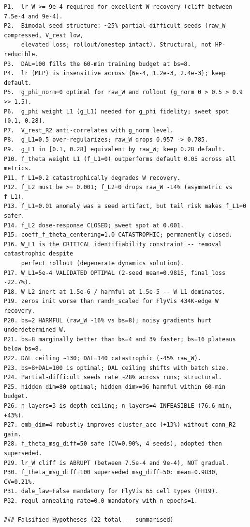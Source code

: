 \documentclass{article}
\begin{document}
\begin{tiny}
\begin{verbatim}
P1.  lr_W >= 9e-4 required for excellent W recovery (cliff between 7.5e-4 and 9e-4).
P2.  Bimodal seed structure: ~25% partial-difficult seeds (raw_W compressed, V_rest low,
     elevated loss; rollout/onestep intact). Structural, not HP-reducible.
P3.  DAL=100 fills the 60-min training budget at bs=8.
P4.  lr (MLP) is insensitive across {6e-4, 1.2e-3, 2.4e-3}; keep default.
P5.  g_phi_norm=0 optimal for raw_W and rollout (g_norm 0 > 0.5 > 0.9 >> 1.5).
P6.  g_phi weight L1 (g_L1) needed for g_phi fidelity; sweet spot [0.1, 0.28].
P7.  V_rest_R2 anti-correlates with g_norm level.
P8.  g_L1=0.5 over-regularizes; raw_W drops 0.957 -> 0.785.
P9.  g_L1 in [0.1, 0.28] equivalent by raw_W; keep 0.28 default.
P10. f_theta weight L1 (f_L1=0) outperforms default 0.05 across all metrics.
P11. f_L1=0.2 catastrophically degrades W recovery.
P12. f_L2 must be >= 0.001; f_L2=0 drops raw_W -14% (asymmetric vs f_L1).
P13. f_L1=0.01 anomaly was a seed artifact, but tail risk makes f_L1=0 safer.
P14. f_L2 dose-response CLOSED; sweet spot at 0.001.
P15. coeff_f_theta_centering=1.0 CATASTROPHIC; permanently closed.
P16. W_L1 is the CRITICAL identifiability constraint -- removal catastrophic despite
     perfect rollout (degenerate dynamics solution).
P17. W_L1=5e-4 VALIDATED OPTIMAL (2-seed mean=0.9815, final_loss -22.7%).
P18. W_L2 inert at 1.5e-6 / harmful at 1.5e-5 -- W_L1 dominates.
P19. zeros init worse than randn_scaled for FlyVis 434K-edge W recovery.
P20. bs=2 HARMFUL (raw_W -16% vs bs=8); noisy gradients hurt underdetermined W.
P21. bs=8 marginally better than bs=4 and 3% faster; bs=16 plateaus below bs=8.
P22. DAL ceiling ~130; DAL=140 catastrophic (-45% raw_W).
P23. bs=8+DAL=100 is optimal; DAL ceiling shifts with batch size.
P24. Partial-difficult seeds rate ~28% across runs; structural.
P25. hidden_dim=80 optimal; hidden_dim>=96 harmful within 60-min budget.
P26. n_layers=3 is depth ceiling; n_layers=4 INFEASIBLE (76.6 min, +43%).
P27. emb_dim=4 robustly improves cluster_acc (+13%) without conn_R2 gain.
P28. f_theta_msg_diff=50 safe (CV=0.90%, 4 seeds), adopted then superseded.
P29. lr_W cliff is ABRUPT (between 7.5e-4 and 9e-4), NOT gradual.
P30. f_theta_msg_diff=100 superseded msg_diff=50: mean=0.9830, CV=0.21%.
P31. dale_law=False mandatory for FlyVis 65 cell types (FH19).
P32. regul_annealing_rate=0.0 mandatory with n_epochs=1.

### Falsified Hypotheses (22 total -- summarised)


\end{verbatim}
\end{tiny}
\end{document}
